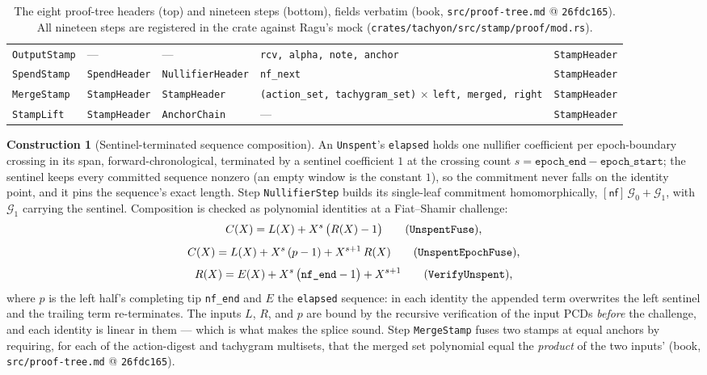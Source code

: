 \documentclass[11pt,a4paper]{article}
\theoremstyle{definition}
\newtheorem{construction}[theorem]{Construction}
\newcommand{\nfsym}{\mathsf{nf}}
\begin{document}
\begin{table}[htbp]
\begin{tabular}{@{}lllp{3.9cm}l@{}}
\texttt{OutputStamp} & --- & --- & \texttt{rcv, alpha, note, anchor}
  & \texttt{StampHeader} \\
\texttt{SpendStamp} & \texttt{SpendHeader} & \texttt{NullifierHeader}
  & \texttt{nf\_next} & \texttt{StampHeader} \\
\texttt{MergeStamp} & \texttt{StampHeader} & \texttt{StampHeader}
  & \texttt{(action\_set, tachygram\_set)} $\times$ \texttt{left, merged,
  right} & \texttt{StampHeader} \\
\texttt{StampLift} & \texttt{StampHeader} & \texttt{AnchorChain} & ---
  & \texttt{StampHeader} \\
\bottomrule
\end{tabular}
\caption{The eight proof-tree headers (top) and nineteen steps (bottom),
fields verbatim (book, \texttt{src/proof-tree.md} @ \texttt{26fdc165}).
All nineteen steps are registered in the crate against Ragu's mock
(\texttt{crates/tachyon/src/stamp/proof/mod.rs}).}
\label{tab:tachyon-design-steps}
\end{table}

\begin{construction}[Sentinel-terminated sequence composition]
\label{def:tachyon-design-splice}
An \texttt{Unspent}'s \texttt{elapsed} holds one nullifier coefficient per
epoch-boundary crossing in its span, forward-chronological, terminated by a
sentinel coefficient $1$ at the crossing count
$s = \texttt{epoch\_end} - \texttt{epoch\_start}$; the sentinel keeps every
committed sequence nonzero (an empty window is the constant $1$), so the
commitment never falls on the identity point, and it pins the sequence's
exact length. Step \texttt{NullifierStep} builds its single-leaf commitment
homomorphically, $[\nfsym]\,\mathcal{G}_0 + \mathcal{G}_1$, with
$\mathcal{G}_1$ carrying the sentinel. Composition is checked as polynomial
identities at a Fiat--Shamir challenge:
\[
C(X) = L(X) + X^{s}\,\bigl(R(X) - 1\bigr)
\qquad \text{(\texttt{UnspentFuse}),}
\]
\[
C(X) = L(X) + X^{s}\,(p - 1) + X^{s+1}\,R(X)
\qquad \text{(\texttt{UnspentEpochFuse}),}
\]
\[
R(X) = E(X) + X^{s}\,\bigl(\texttt{nf\_end} - 1\bigr) + X^{s+1}
\qquad \text{(\texttt{VerifyUnspent}),}
\]
where $p$ is the left half's completing tip \texttt{nf\_end} and $E$ the
\texttt{elapsed} sequence: in each identity the appended term overwrites
the left sentinel and the trailing term re-terminates. The inputs $L$,
$R$, and $p$ are bound by the recursive verification of the input PCDs
\emph{before} the challenge, and each identity is linear in them --- which
is what makes the splice sound. Step \texttt{MergeStamp} fuses two stamps at
equal anchors by requiring, for each of the action-digest and tachygram
multisets, that the merged set polynomial equal the \emph{product} of the
two inputs' (book, \texttt{src/proof-tree.md} @ \texttt{26fdc165}).
\end{construction}
\end{document}
